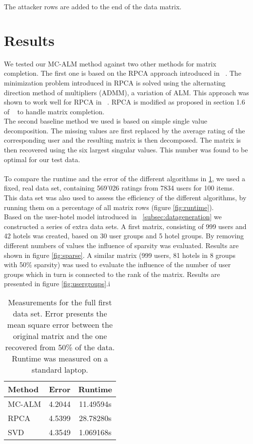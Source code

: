 \documentclass[10pt,conference,compsocconf]{IEEEtran}
\begin{document}
The attacker rows are added to the end of the data matrix.


\section{Results}
We tested our MC-ALM method against two other methods for matrix completion. The first one is based on the RPCA approach introduced in ~\cite{rpcapaper}. The minimization problem introduced in RPCA is solved using the alternating direction method of multipliers (ADMM), a variation of ALM. This approach was shown to work well for RPCA in ~\cite{rpcaalgo}. RPCA is modified as proposed in section 1.6 of ~\cite{rpcapaper} to handle matrix completion.\\
The second baseline method we used is based on simple single value decomposition. The missing values are first replaced by the average rating of the corresponding user and the resulting matrix is then decomposed. The matrix is then recovered using the six largest singular values. This number was found to be optimal for our test data. 

\paragraph{}
To compare the runtime and the error of the different algorithms in \ref{tab:overview}, we used a fixed, real data set, containing 569'026 ratings from 7834 users for 100 items. This data set was also used to assess the efficiency of the different algorithms, by running them on a percentage of all matrix rows (figure \ref{fig:runtime}).\\

Based on the user-hotel model introduced in ~\ref{subsec:datageneration} we constructed a series of extra data sets. A first matrix, consisting of 999 users and 42 hotels was created, based on 30 user groups and 5 hotel groups. By removing different numbers of values the influence of sparsity was evaluated. Results are shown in figure \ref{fig:sparse}. A similar matrix (999 users, 81 hotels in 8 groups with 50\% sparsity) was used to evaluate the influence of the number of user groups which in turn is connected to the rank of the matrix. Results are presented in figure \ref{fig:usergroups}.i


\begin{table}%
\centering
\begin{tabular}{|l|c|c|}
\hline
Method & Error & Runtime\\
\hline
MC-ALM & 4.2044 & 11.49594s\\
RPCA & 4.5399 & 28.78280s\\
SVD & 4.3549 & 1.069168s\\
\hline
\end{tabular}
\caption{Measurements for the full first data set. Error presents the mean square error between the original matrix and the one recovered from 50\% of the data. Runtime was measured on a standard laptop.}
\label{tab:overview}
\end{table}
\end{document}
